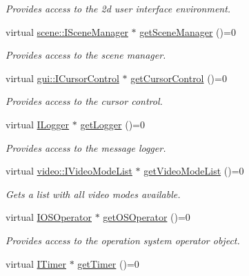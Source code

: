 \begin{DoxyCompactItemize}
\begin{DoxyCompactList}\small\item\em Provides access to the 2d user interface environment. \end{DoxyCompactList}\item 
virtual \hyperlink{classirr_1_1scene_1_1ISceneManager}{scene\+::\+I\+Scene\+Manager} $\ast$ \hyperlink{classirr_1_1IrrlichtDevice_a891b503ff4d5041296d88f23f97d7b3d}{get\+Scene\+Manager} ()=0
\begin{DoxyCompactList}\small\item\em Provides access to the scene manager. \end{DoxyCompactList}\item 
virtual \hyperlink{classirr_1_1gui_1_1ICursorControl}{gui\+::\+I\+Cursor\+Control} $\ast$ \hyperlink{classirr_1_1IrrlichtDevice_a500a3b7bf69487ff7e2075dd0b0db529}{get\+Cursor\+Control} ()=0
\begin{DoxyCompactList}\small\item\em Provides access to the cursor control. \end{DoxyCompactList}\item 
virtual \hyperlink{classirr_1_1ILogger}{I\+Logger} $\ast$ \hyperlink{classirr_1_1IrrlichtDevice_adec0b0b6b71b5066dd2c7039f1f4d85b}{get\+Logger} ()=0
\begin{DoxyCompactList}\small\item\em Provides access to the message logger. \end{DoxyCompactList}\item 
virtual \hyperlink{classirr_1_1video_1_1IVideoModeList}{video\+::\+I\+Video\+Mode\+List} $\ast$ \hyperlink{classirr_1_1IrrlichtDevice_a8872867a5ad728a4673679e9e8f469e7}{get\+Video\+Mode\+List} ()=0
\begin{DoxyCompactList}\small\item\em Gets a list with all video modes available. \end{DoxyCompactList}\item 
virtual \hyperlink{classirr_1_1IOSOperator}{I\+O\+S\+Operator} $\ast$ \hyperlink{classirr_1_1IrrlichtDevice_a3833250e8b0d7a94cd34b1e1809033ac}{get\+O\+S\+Operator} ()=0
\begin{DoxyCompactList}\small\item\em Provides access to the operation system operator object. \end{DoxyCompactList}\item 
virtual \hyperlink{classirr_1_1ITimer}{I\+Timer} $\ast$ \hyperlink{classirr_1_1IrrlichtDevice_a96c30fb7f644e1d1dabff563bde26460}{get\+Timer} ()=0

\end{DoxyCompactItemize}

